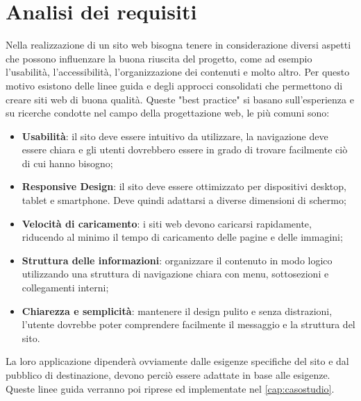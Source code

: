 \documentclass[target=bach,aauheader=]{thud}
\begin{document}
\section{Analisi dei requisiti}
Nella realizzazione di un sito web bisogna tenere in considerazione diversi aspetti che possono influenzare la buona riuscita del progetto, come ad esempio l'usabilità, l'accessibilità, l'organizzazione dei contenuti e molto altro.
Per questo motivo esistono delle linee guida e degli approcci consolidati che permettono di creare siti web di buona qualità. Queste "best practice" si basano sull'esperienza e su ricerche condotte nel campo della progettazione web, le più comuni sono:
\begin{itemize}
    \item \textbf{Usabilità}: il sito deve essere intuitivo da utilizzare, la navigazione deve essere chiara e gli utenti dovrebbero essere in grado di trovare facilmente ciò di cui hanno bisogno;
    \item \textbf{Responsive Design}: il sito deve essere ottimizzato per dispositivi desktop, tablet e smartphone. Deve quindi adattarsi a diverse dimensioni di schermo;
    \item \textbf{Velocità di caricamento}: i siti web devono caricarsi rapidamente, riducendo al minimo il tempo di caricamento delle pagine e delle immagini;
    \item \textbf{Struttura delle informazioni}: organizzare il contenuto in modo logico utilizzando una struttura di navigazione chiara con menu, sottosezioni e collegamenti interni;
    \item \textbf{Chiarezza e semplicità}: mantenere il design pulito e senza distrazioni, l'utente dovrebbe poter comprendere facilmente il messaggio e la struttura del sito.
\end{itemize}
La loro applicazione dipenderà ovviamente dalle esigenze specifiche del sito e dal pubblico di destinazione, devono perciò essere adattate in base alle esigenze.
\newline Queste linee guida verranno poi riprese ed implementate nel \cref{cap:casostudio}.

\end{document}
